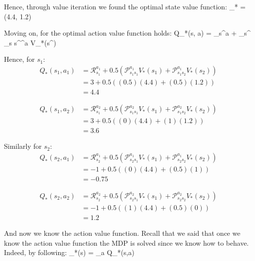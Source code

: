 Hence, through value iteration we found the optimal state value function:
\bse
{}_* = (4.4, 1.2)
\ese

Moving on, for the optimal action value function holds:
\bse
Q_{*}(s, a) = _{s}^{a} + \gamma \sum_{s^{\prime}} _{s s^\prime}^{a} V_{*}(s^\prime)
\ese

Hence, for $s_1$:
\begin{align*}
Q_{*}(s_1, a_1) & = \mathcal{R}_{s_1}^{a_1} + 0.5 \left(\mathcal{P}_{s_1 s_1}^{a_1} V_{*}(s_1) +
\mathcal{P}_{s_1 s_2}^{a_1} V_{*}(s_2) \right) \\
& =3 + 0.5 \left((0.5) (4.4) + (0.5) (1.2) \right) \\
& = 4.4
\end{align*}

\vspace{-15pt}

\begin{align*}
Q_{*}(s_1, a_2) & = \mathcal{R}_{s_1}^{a_2} + 0.5 \left(\mathcal{P}_{s_1 s_1}^{a_2} V_{*}(s_1) +
\mathcal{P}_{s_1 s_2}^{a_2} V_{*}(s_2) \right) \\
& = 3 + 0.5 \left((0) (4.4) + (1) (1.2) \right) \\
& = 3.6
\end{align*}

Similarly for $s_2$:
\begin{align*}
Q_{*}(s_2, a_1) & = \mathcal{R}_{s_2}^{a_1} + 0.5 \left(\mathcal{P}_{s_2 s_1}^{a_1} V_{*}(s_1) +
\mathcal{P}_{s_2 s_2}^{a_1} V_{*}(s_2) \right) \\
& = -1 + 0.5 \left((0) (4.4) + (0.5) (1) \right) \\
& = -0.75
\end{align*}

\vspace{-15pt}

\begin{align*}
Q_{*}(s_2, a_2) & = \mathcal{R}_{s_2}^{a_2} + 0.5 \left(\mathcal{P}_{s_2 s_1}^{a_2} V_{*}(s_1) +
\mathcal{P}_{s_2 s_2}^{a_2} V_{*}(s_2) \right) \\
& = -1 + 0.5 \left((1) (4.4) + (0.5) (0) \right) \\
& = 1.2
\end{align*}

And now we know the action value function. Recall that we said that once we know the action value function the MDP is
solved since we know how to behave. Indeed, by following:
\bse
\pi_*(s) = \argmax_{a} Q_*(s,a)
\ese

